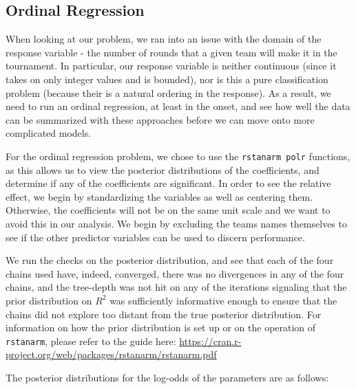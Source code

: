 \documentclass[10pt,a4paper, hidelinks]{article} %
\begin{document}
\subsection{Ordinal Regression}

When looking at our problem, we ran into an issue with the domain of the response variable - the number of rounds that a given team will make it in the tournament. In particular, our response variable is neither continuous (since it takes on only integer values and is bounded), nor is this a pure classification problem (because their is a natural ordering in the response). As a result, we need to run an ordinal regression, at least in the onset, and see how well the data can be summarized with these approaches before we can move onto more complicated models. 

For the ordinal regression problem, we chose to use the \texttt{rstanarm polr} functions, as this allows us to view the posterior distributions of the coefficients, and determine if any of the coefficients are significant. In order to see the relative effect, we begin by standardizing the variables as well as centering them. Otherwise, the coefficients will not be on the same unit scale and we want to avoid this in our analysis. We begin by excluding the teams names themselves to see if the other predictor variables can be used to discern performance. 

We run the checks on the posterior distribution, and see that each of the four chains used have, indeed, converged, there was no divergences in any of the four chains, and the tree-depth was not hit on any of the iterations signaling that the prior distribution on $R^2$ was sufficiently informative enough to ensure that the chains did not explore too distant from the true posterior distribution. For information on how the prior distribution is set up or on the operation of \texttt{rstanarm}, please refer to the guide here: {\color{blue} \url{https://cran.r-project.org/web/packages/rstanarm/rstanarm.pdf}}

The posterior distributions for the log-odds of the parameters are as follows:
\end{document}
